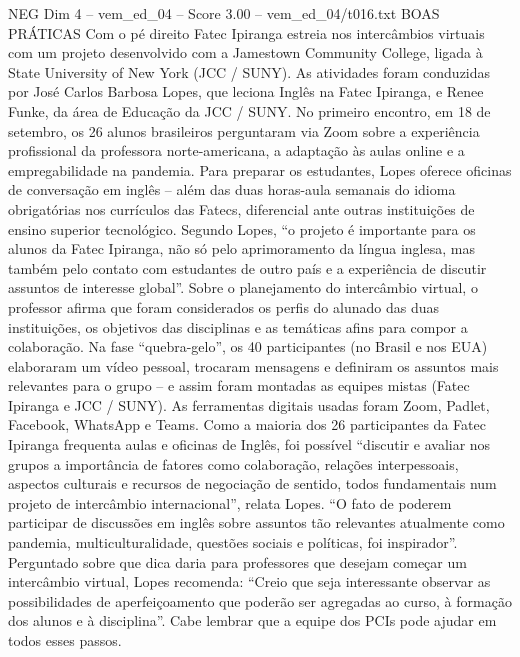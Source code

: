 \begin{textsample}{NEG Dim 4 – vem\_ed\_04 – Score 3.00 – vem\_ed\_04/t016.txt}  \label{ex:f4_neg_110}
BOAS PRÁTICAS Com o pé direito Fatec Ipiranga estreia nos intercâmbios virtuais com um projeto desenvolvido com a Jamestown Community College, ligada à State University of New York (JCC / SUNY).
As atividades foram conduzidas por José Carlos Barbosa Lopes, que leciona Inglês na Fatec Ipiranga, e Renee Funke, da área de Educação da JCC / SUNY.
No primeiro encontro, em 18 de setembro, os 26 alunos brasileiros perguntaram via Zoom sobre a experiência profissional da professora norte-americana, a adaptação às aulas online e a empregabilidade na pandemia.
Para preparar os estudantes, Lopes oferece oficinas de conversação em inglês – além das duas horas-aula semanais do idioma obrigatórias nos currículos das Fatecs, diferencial ante outras instituições de ensino superior tecnológico.
Segundo Lopes, “o projeto é importante para os alunos da Fatec Ipiranga, não só pelo aprimoramento da língua inglesa, mas também pelo contato com estudantes de outro país e a experiência de discutir assuntos de interesse global”.
Sobre o planejamento do intercâmbio virtual, o professor afirma que foram considerados os perfis do alunado das duas instituições, os objetivos das disciplinas e as temáticas afins para compor a colaboração.
Na fase “quebra-gelo”, os 40 participantes (no Brasil e nos EUA) elaboraram um vídeo pessoal, trocaram mensagens e definiram os assuntos mais relevantes para o grupo – e assim foram montadas as equipes mistas (Fatec Ipiranga e JCC / SUNY).
As ferramentas digitais usadas foram Zoom, Padlet, Facebook, WhatsApp e Teams.
Como a maioria dos 26 participantes da Fatec Ipiranga frequenta aulas e oficinas de Inglês, foi possível “discutir e avaliar nos grupos a importância de fatores como colaboração, relações interpessoais, aspectos culturais e recursos de negociação de sentido, todos fundamentais num projeto de intercâmbio internacional”, relata Lopes. “O fato de poderem participar de discussões em inglês sobre assuntos tão relevantes atualmente como pandemia, multiculturalidade, questões sociais e políticas, foi inspirador”.
Perguntado sobre que dica daria para professores que desejam começar um intercâmbio virtual, Lopes recomenda: “Creio que seja interessante observar as possibilidades de aperfeiçoamento que poderão ser agregadas ao curso, à formação dos alunos e à disciplina”.
Cabe lembrar que a equipe dos PCIs pode ajudar em todos esses passos.

\end{textsample}
